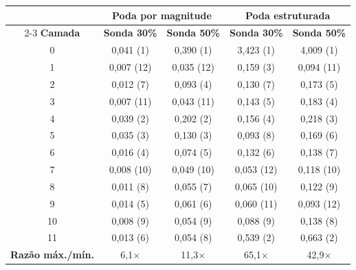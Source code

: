\begin{tabular}{c cc cc}
\hline
& \multicolumn{2}{c}{\textbf{Poda por magnitude}} & \multicolumn{2}{c}{\textbf{Poda estruturada}} \\
\cline{2-3} \cline{4-5}
\textbf{Camada} & \textbf{Sonda 30\%} & \textbf{Sonda 50\%} & \textbf{Sonda 30\%} & \textbf{Sonda 50\%} \\
\hline
0 & 0,041 (1) & 0,390 (1) & 3,423 (1) & 4,009 (1) \\
1 & 0,007 (12) & 0,035 (12) & 0,159 (3) & 0,094 (11) \\
2 & 0,012 (7) & 0,093 (4) & 0,130 (7) & 0,173 (5) \\
3 & 0,007 (11) & 0,043 (11) & 0,143 (5) & 0,183 (4) \\
4 & 0,039 (2) & 0,202 (2) & 0,156 (4) & 0,218 (3) \\
5 & 0,035 (3) & 0,130 (3) & 0,093 (8) & 0,169 (6) \\
6 & 0,016 (4) & 0,074 (5) & 0,132 (6) & 0,138 (7) \\
7 & 0,008 (10) & 0,049 (10) & 0,053 (12) & 0,118 (10) \\
8 & 0,011 (8) & 0,055 (7) & 0,065 (10) & 0,122 (9) \\
9 & 0,014 (5) & 0,061 (6) & 0,060 (11) & 0,093 (12) \\
10 & 0,008 (9) & 0,054 (9) & 0,088 (9) & 0,138 (8) \\
11 & 0,013 (6) & 0,054 (8) & 0,539 (2) & 0,663 (2) \\
\addlinespace
\textbf{Razão máx./mín.} & 6,1$\times$ & 11,3$\times$ & 65,1$\times$ & 42,9$\times$ \\
\hline
\end{tabular}
